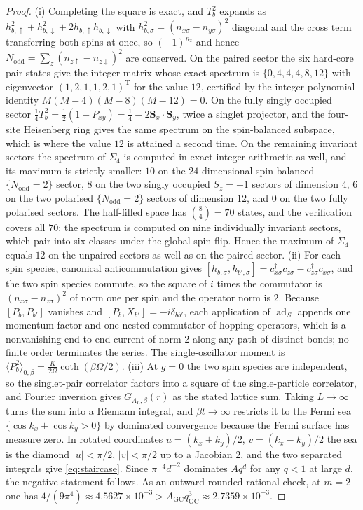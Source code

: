 \documentclass[11pt]{article}
\theoremstyle{definition}
\theoremstyle{remark}
\begin{document}
\begin{proof}
(i) Completing the square is exact, and $T_b^2$ expands as
$h_{b,\uparrow}^2+h_{b,\downarrow}^2+2h_{b,\uparrow}h_{b,\downarrow}$ with
$h_{b,\sigma}^2=(n_{x\sigma}-n_{y\sigma})^2$ diagonal and the cross term transferring
both spins at once, so $(-1)^{n_z}$ and hence $N_{\mathrm{odd}}=\sum_z(n_{z\uparrow}
-n_{z\downarrow})^2$ are conserved. On the paired sector the six hard-core pair states
give the integer matrix whose exact spectrum is $\{0,4,4,4,8,12\}$ with eigenvector
$(1,2,1,1,2,1)^{\mathrm T}$ for the value $12$, certified by the integer polynomial
identity $M(M-4)(M-8)(M-12)=0$. On the fully singly occupied sector
$\frac14T_b^2=\frac12(1-P_{xy})=\frac14-2\mathbf S_x\cdot\mathbf S_y$, twice a singlet
projector, and the four-site Heisenberg ring gives the same spectrum on the
spin-balanced subspace, which is where the value $12$ is attained a second time. On
the remaining invariant sectors the spectrum of $\Sigma_4$ is computed in exact
integer arithmetic as well, and its maximum is strictly smaller: $10$ on the
$24$-dimensional spin-balanced $\{N_{\mathrm{odd}}=2\}$ sector, $8$ on the two singly
occupied $S_z=\pm1$ sectors of dimension $4$, $6$ on the two polarised
$\{N_{\mathrm{odd}}=2\}$ sectors of dimension $12$, and $0$ on the two fully polarised
sectors. The half-filled space has $\binom84=70$ states, and the verification covers
all $70$: the spectrum is computed on nine individually invariant sectors, which pair
into six classes under the global spin flip. Hence the maximum of $\Sigma_4$ equals
$12$ on the unpaired sectors as well as on the paired sector.
(ii) For each spin species, canonical anticommutation gives
$[h_{b,\sigma},h_{b',\sigma}]=c_{x\sigma}^\dagger c_{z\sigma}-c_{z\sigma}^\dagger
c_{x\sigma}$, and the two spin species commute, so the square of $i$ times the
commutator is $(n_{x\sigma}-n_{z\sigma})^2$ of norm one per spin and the operator norm
is $2$. Because $[P_b,P_{b'}]$ vanishes and $[P_b,X_{b'}]=-i\delta_{bb'}$, each
application of $\operatorname{ad}_S$ appends one momentum factor and one nested commutator
of hopping operators, which is a nonvanishing end-to-end current of norm $2$ along any
path of distinct bonds; no finite order terminates the series. The single-oscillator
moment is $\langle P_b^2\rangle_{0,\beta}=\frac{K}{2\Omega}\coth(\beta\Omega/2)$.
(iii) At $g=0$ the two spin species are independent, so the singlet-pair correlator
factors into a square of the single-particle correlator, and Fourier inversion gives
$G_{\Lambda_L,\beta}(r)$ as the stated lattice sum. Taking $L\to\infty$ turns the sum
into a Riemann integral, and $\beta t\to\infty$ restricts it to the Fermi sea
$\{\cos k_x+\cos k_y>0\}$ by dominated convergence because the Fermi surface has
measure zero. In rotated coordinates $u=(k_x+k_y)/2$, $v=(k_x-k_y)/2$ the sea is the
diamond $|u|<\pi/2$, $|v|<\pi/2$ up to a Jacobian $2$, and the two separated integrals
give \eqref{eq:staircase}. Since $\pi^{-4}d^{-2}$ dominates $Aq^{d}$ for any $q<1$ at
large $d$, the negative statement follows. As an outward-rounded rational check, at
$m=2$ one has $4/(9\pi^4)\approx4.5627\times10^{-3}>A_{\mathrm{GC}}q_{\mathrm{GC}}^3
\approx2.7359\times10^{-3}$.
\end{proof}
\end{document}
